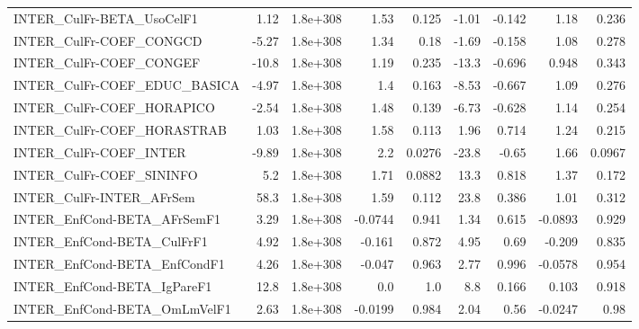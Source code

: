 \begin{tabular}{lrrrrrrrr}
INTER\_CulFr-BETA\_UsoCelF1             &        1.12 &     1.8e+308 &     1.53 &    0.125 &      -1.01 &      -0.142 &         1.18 &         0.236 \\
INTER\_CulFr-COEF\_CONGCD               &       -5.27 &     1.8e+308 &     1.34 &     0.18 &      -1.69 &      -0.158 &         1.08 &         0.278 \\
INTER\_CulFr-COEF\_CONGEF               &       -10.8 &     1.8e+308 &     1.19 &    0.235 &      -13.3 &      -0.696 &        0.948 &         0.343 \\
INTER\_CulFr-COEF\_EDUC\_BASICA          &       -4.97 &     1.8e+308 &      1.4 &    0.163 &      -8.53 &      -0.667 &         1.09 &         0.276 \\
INTER\_CulFr-COEF\_HORAPICO             &       -2.54 &     1.8e+308 &     1.48 &    0.139 &      -6.73 &      -0.628 &         1.14 &         0.254 \\
INTER\_CulFr-COEF\_HORASTRAB            &        1.03 &     1.8e+308 &     1.58 &    0.113 &       1.96 &       0.714 &         1.24 &         0.215 \\
INTER\_CulFr-COEF\_INTER                &       -9.89 &     1.8e+308 &      2.2 &   0.0276 &      -23.8 &       -0.65 &         1.66 &        0.0967 \\
INTER\_CulFr-COEF\_SININFO              &         5.2 &     1.8e+308 &     1.71 &   0.0882 &       13.3 &       0.818 &         1.37 &         0.172 \\
INTER\_CulFr-INTER\_AFrSem              &        58.3 &     1.8e+308 &     1.59 &    0.112 &       23.8 &       0.386 &         1.01 &         0.312 \\
INTER\_EnfCond-BETA\_AFrSemF1           &        3.29 &     1.8e+308 &  -0.0744 &    0.941 &       1.34 &       0.615 &      -0.0893 &         0.929 \\
INTER\_EnfCond-BETA\_CulFrF1            &        4.92 &     1.8e+308 &   -0.161 &    0.872 &       4.95 &        0.69 &       -0.209 &         0.835 \\
INTER\_EnfCond-BETA\_EnfCondF1          &        4.26 &     1.8e+308 &   -0.047 &    0.963 &       2.77 &       0.996 &      -0.0578 &         0.954 \\
INTER\_EnfCond-BETA\_IgPareF1           &        12.8 &     1.8e+308 &      0.0 &      1.0 &        8.8 &       0.166 &        0.103 &         0.918 \\
INTER\_EnfCond-BETA\_OmLmVelF1          &        2.63 &     1.8e+308 &  -0.0199 &    0.984 &       2.04 &        0.56 &      -0.0247 &          0.98 \\

\end{tabular}
